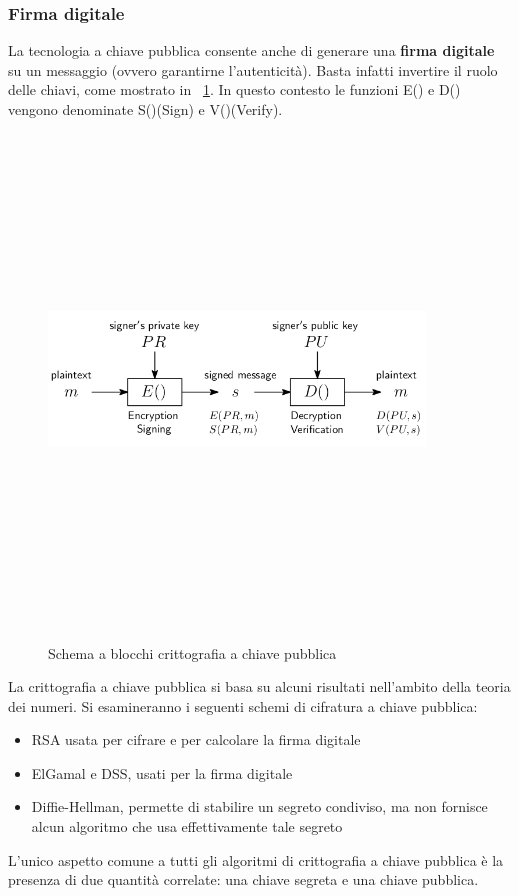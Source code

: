 \subsubsection{Firma digitale}
La tecnologia a chiave pubblica consente anche di generare una \textbf{firma digitale} su un messaggio (ovvero garantirne l'autenticità). Basta infatti invertire il ruolo delle chiavi, come mostrato in \figurename~\ref{fig:pubblica_schema_firma}. In questo contesto le funzioni E() e D() vengono denominate S()(Sign) e V()(Verify). 
\begin{figure}[htbp]
	\centering%
	\subfigure%
	{\includegraphics[height=13cm, width=10cm, keepaspectratio]{Immagini/chiave_pubblica/chiave_pubblica_firma.png}}
	\caption{Schema a blocchi crittografia a chiave pubblica \label{fig:pubblica_schema_firma}} 	
\end{figure}

La crittografia a chiave pubblica si basa su alcuni risultati nell'ambito della teoria dei numeri. Si esamineranno i seguenti schemi di cifratura a chiave pubblica: 
\begin{itemize}
\item RSA usata per cifrare e per calcolare la firma digitale
\item ElGamal e DSS, usati per la firma digitale
\item Diffie-Hellman, permette di stabilire un segreto condiviso, ma non fornisce alcun algoritmo che usa effettivamente tale segreto
\end{itemize}
L'unico aspetto comune a tutti gli algoritmi di crittografia a chiave pubblica è la presenza di due quantità correlate: una chiave segreta e una chiave pubblica.
